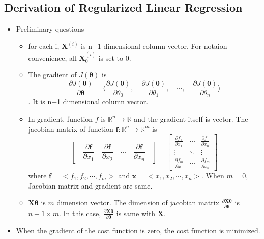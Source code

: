 \documentclass[a4paper]{article}
\begin{document}
\subsection{Derivation of Regularized Linear Regression}
\begin{itemize}
  \item Preliminary questions
    \begin{itemize}
      \item for each i, \(\bm{X}^{(i)}\) is n+1 dimensional column vector. For
        notaion convenience, all \(\bm{X}_0^{(i)}\) is set to \(0\).
      \item The gradient of \(J(\bm{\theta})\) is \[
          \frac{\partial J(\bm{\theta})}{\partial \bm{\theta}} = \langle
          \frac{\partial J(\bm{\theta})}{\partial \theta_0}, \quad
          \frac{\partial J(\bm{\theta})}{\partial \theta_1}, \quad
          \cdots, \quad
          \frac{\partial J(\bm{\theta})}{\partial \theta_n}
          \rangle
        \]. It is n+1 dimensional column vector.
      \item In gradient, function \(f\) is
        \(\mathbb{R}^n\rightarrow\mathbb{R} \) and the gradient itself is vector.
        The jacobian matrix of function
        \(\bm{f}\colon\mathbb{R}^n\rightarrow\mathbb{R}^m\) is
        \[[
          \quad \frac{\partial \bm{f}}{\partial x_1} \quad
          \frac{\partial \bm{f}}{\partial x_2} \quad
          \cdots \quad \frac{\partial \bm{f}}{\partial x_n} \quad
          ] =
          \begin{bmatrix}
            \frac{\partial f_1}{\partial x_1} & \cdots & \frac{\partial f_1}{\partial x_n} \\
            \vdots & \ddots & \vdots \\
            \frac{\partial f_m}{\partial x_1} & \cdots & \frac{\partial f_m}{\partial x_n}
          \end{bmatrix}
          \]
          where \(\bm{f} = <f_1, f_2, \cdots, f_m>\) and \(\bm{x} = <x_1, x_2, \cdots, x_n>\).
          When \(m=0\), Jacobian matrix and gradient are same.
        \item \(\bm{X\theta}\) is \(m\) dimension vector. The dimension of jacobian
          matrix \(\frac{\partial \bm{X\theta}}{\partial \bm{\theta}}\) is \(n+1 \times m\).
          In this case, \(\frac{\partial \bm{X\theta}}{\partial \bm{\theta}}\) is same with \(\bm{X}\).
    \end{itemize}
  \item When the gradient of the cost function is zero, the cost function is minimized.

\end{itemize}
\end{document}
